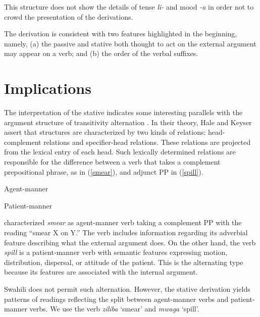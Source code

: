 \documentclass[output=paper]{langscibook}
\begin{document}
This structure does not show the details of tense \textit{li-} and mood \textit{-a} in order not to crowd the presentation of the derivations. 

The derivation is consistent with two features highlighted in the beginning, namely, (a) the passive and stative both thought to act on the external argument may appear on a verb; and (b) the order of the verbal suffixes.  

\section{Implications}
The interpretation of the stative indicates some interesting parallels with the argument structure of transitivity alternation \citep{Hale:2002aa}. In their theory, Hale and Keyser assert that structures are characterized by two kinds of relations: head-complement relations and specifier-head relations. These relations are projected from the lexical entry of each head. Such lexically determined relations are responsible for the difference between a verb that takes a complement prepositional phrase, as in (\ref{smear}), and adjunct PP in (\ref{spill}).

\begin{exe}
\ex\label{smear}{Agent-manner
\begin{xlist}
\end{xlist}
}

\ex\label{spill}{Patient-manner
\begin{xlist}
\end{xlist}
}
\end{exe}
\cite{Hale:2002aa} characterized \textit{smear} as agent-manner verb taking a complement PP with the reading ``smear X on Y.'' The verb includes information regarding its adverbial feature describing what the external argument does. On the other hand, the verb \textit{spill} is a patient-manner verb with semantic features expressing motion, distribution, dispersal, or attitude of the patient. This is the alternating type because its features are associated with the internal argument. 

Swahili does not permit such alternation. However, the stative derivation yields patterns of readings reflecting the split between agent-manner verbs and patient-manner verbs. We use the verb \textit{ziliba} `smear' and \textit{mwaga} `spill'. 
\end{document}
